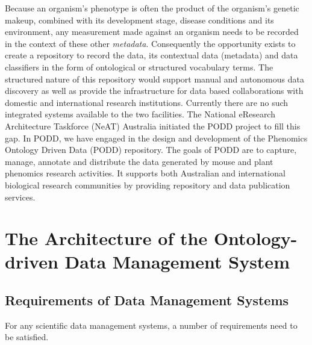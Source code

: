 \documentclass{elsarticle}
\begin{document}
Because an organism's phenotype is often the product of the organism's
genetic makeup, combined with its development stage, disease conditions
and its environment, any measurement made against an organism needs to
be recorded in the context of these other \emph{metadata}. Consequently
the opportunity exists to create a repository to record the data, its
contextual data (metadata) and data classifiers in the form of
ontological or structured vocabulary terms. The structured nature of
this repository would support manual and autonomous data discovery as
well as provide the infrastructure for data based collaborations with
domestic and international research institutions. Currently there are
no such integrated systems available to the two facilities. The
National eResearch Architecture Taskforce (NeAT) Australia initiated
the PODD project to fill this gap. In PODD, we have engaged in the
design and development of the Phenomics Ontology Driven Data (PODD)
repository. The goals of PODD are to capture, manage, annotate and
distribute the data generated by mouse and plant phenomics research
activities. It supports both Australian and international biological
research communities by providing repository and data publication
services.

\section{The Architecture of the Ontology-driven Data Management System}\label{sec:design}

\subsection{Requirements of Data Management Systems}
For any scientific data management systems, a number of requirements
need to be satisfied.
\end{document}
